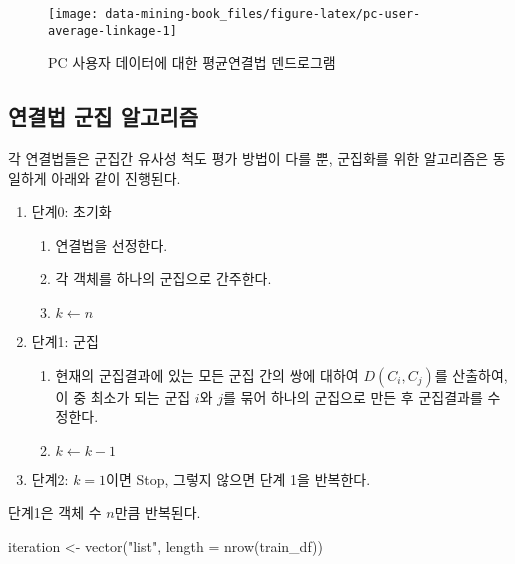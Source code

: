 \documentclass[
]{book}
\newenvironment{Shaded}{\begin{snugshade}}{\end{snugshade}}
\newcommand{\AttributeTok}[1]{\textcolor[rgb]{0.77,0.63,0.00}{#1}}
\newcommand{\FunctionTok}[1]{\textcolor[rgb]{0.00,0.00,0.00}{#1}}
\newcommand{\NormalTok}[1]{#1}
\newcommand{\OtherTok}[1]{\textcolor[rgb]{0.56,0.35,0.01}{#1}}
\newcommand{\StringTok}[1]{\textcolor[rgb]{0.31,0.60,0.02}{#1}}
\providecommand{\tightlist}{%
  \setlength{\itemsep}{0pt}\setlength{\parskip}{0pt}}
\begin{document}
\begin{figure}

{\centering \texttt{[image: data-mining-book\_files/figure-latex/pc-user-average-linkage-1]} 

}

\caption{PC 사용자 데이터에 대한 평균연결법 덴드로그램}\label{fig:pc-user-average-linkage}
\end{figure}

\hypertarget{linkage-method-algorithm}{%
\subsection{연결법 군집 알고리즘}\label{linkage-method-algorithm}}

각 연결법들은 군집간 유사성 척도 평가 방법이 다를 뿐, 군집화를 위한 알고리즘은 동일하게 아래와 같이 진행된다.

\begin{enumerate}
\def\labelenumi{\arabic{enumi}.}
\setcounter{enumi}{-1}
\tightlist
\item
  단계0: 초기화

  \begin{enumerate}
  \def\labelenumii{\arabic{enumii}.}
  \tightlist
  \item
    연결법을 선정한다.
  \item
    각 객체를 하나의 군집으로 간주한다.
  \item
    \(k \leftarrow n\)
  \end{enumerate}
\item
  단계1: 군집

  \begin{enumerate}
  \def\labelenumii{\arabic{enumii}.}
  \tightlist
  \item
    현재의 군집결과에 있는 모든 군집 간의 쌍에 대하여 \(D(C_i, C_j)\)를 산출하여, 이 중 최소가 되는 군집 \(i\)와 \(j\)를 묶어 하나의 군집으로 만든 후 군집결과를 수정한다.
  \item
    \(k \leftarrow k - 1\)
  \end{enumerate}
\item
  단계2: \(k = 1\)이면 Stop, 그렇지 않으면 단계 1을 반복한다.
\end{enumerate}

단계1은 객체 수 \(n\)만큼 반복된다.

\begin{Shaded}
\begin{Highlighting}[]
\NormalTok{iteration }\OtherTok{\textless{}{-}} \FunctionTok{vector}\NormalTok{(}\StringTok{"list"}\NormalTok{, }\AttributeTok{length =} \FunctionTok{nrow}\NormalTok{(train\_df))}
\end{Highlighting}
\end{Shaded}
\end{document}
